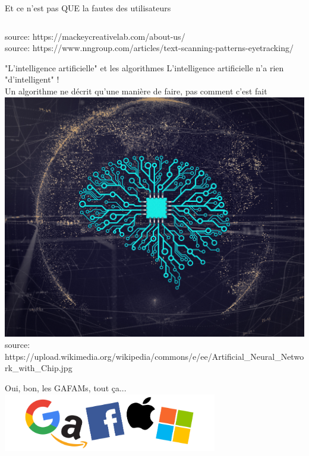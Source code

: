 \begin{frame}{Et ce n'est pas QUE la fautes des utilisateurs}
\begin{columns}
\begin{column}{0.5\textwidth}
\begin{tikzpicture}
    \end{tikzpicture}
  \end{column}
  \end{columns}
  \footnotesize{\tiny{source: https://mackeycreativelab.com/about-us/}}\\
  \footnotesize{\tiny{source: https://www.nngroup.com/articles/text-scanning-patterns-eyetracking/}}
\end{frame}


\begin{frame}{"L'intelligence artificielle" et les algorithmes}
    \small
    L'intelligence artificielle n'a rien "d'intelligent" ! \\
    Un algorithme ne décrit qu'une manière de faire, pas comment c'est fait \\
    {\centering
    \includegraphics[height=0.7\textheight]{usages/intelligence-artificiel.png}\\
    }
  \footnotesize{\tiny{source: https://upload.wikimedia.org/wikipedia/commons/e/ee/Artificial\_Neural\_Network\_with\_Chip.jpg}}
\end{frame}

\begin{frame}{Oui, bon, les GAFAMs, tout ça...}
    \centering
    \includegraphics[width=0.7\textwidth]{usages/gafam.png}
\end{frame}


